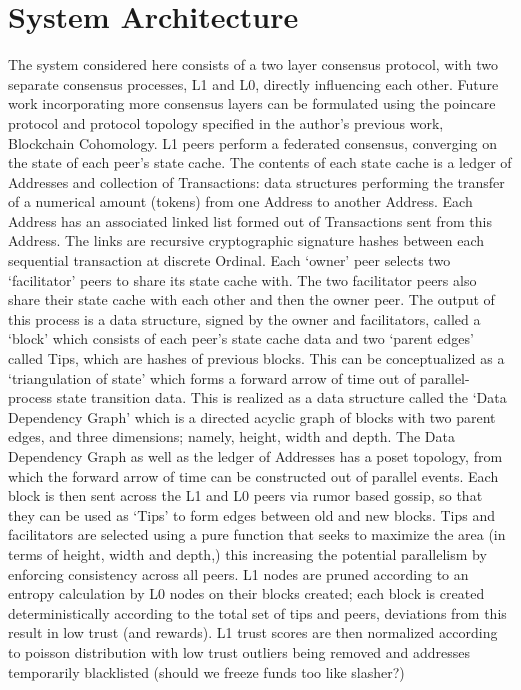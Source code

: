 \documentclass{article}
\begin{document}
\section{System Architecture}
The system considered here consists of a two layer consensus protocol, with two separate consensus processes, L1 and L0, directly influencing each other. Future work incorporating more consensus layers can be formulated using the poincare protocol and protocol topology specified in the author’s previous work, Blockchain Cohomology.
L1 peers perform a federated consensus, converging on the state of each peer’s state cache. The contents of each state cache is a ledger of Addresses and collection of Transactions: data structures performing the transfer of a numerical amount (tokens) from one Address to another Address. Each Address has an associated linked list formed out of Transactions sent from this Address. The links are recursive cryptographic signature hashes between each sequential transaction at discrete Ordinal. Each ‘owner’ peer selects two ‘facilitator’ peers to share its state cache with. The two facilitator peers also share their state cache with each other and then the owner peer. The output of this process is a data structure, signed by the owner and facilitators, called a ‘block’ which consists of each peer’s state cache data and two ‘parent edges’ called Tips, which are hashes of previous blocks. This can be conceptualized as a ‘triangulation of state’ which forms a forward arrow of time out of parallel-process state transition data. This is realized as a data structure called the ‘Data Dependency Graph’ which is a directed acyclic graph of blocks with two parent edges, and three dimensions; namely, height, width and depth. The Data Dependency Graph as well as the ledger of Addresses has a poset topology, from which the forward arrow of time can be constructed out of parallel events. Each block is then sent across the L1 and L0 peers via rumor based gossip, so that they can be used as ‘Tips’ to form edges between old and new blocks. Tips and facilitators are selected using a pure function that seeks to maximize the area (in terms of height, width and depth,) this increasing the potential parallelism by enforcing consistency across all peers. L1 nodes are pruned according to an entropy calculation by L0 nodes on their blocks created; each block is created deterministically according to the total set of tips and peers, deviations from this result in low trust (and rewards). L1 trust scores are then normalized according to poisson distribution with low trust outliers being removed and addresses temporarily blacklisted (should we freeze funds too like slasher?)
\end{document}
